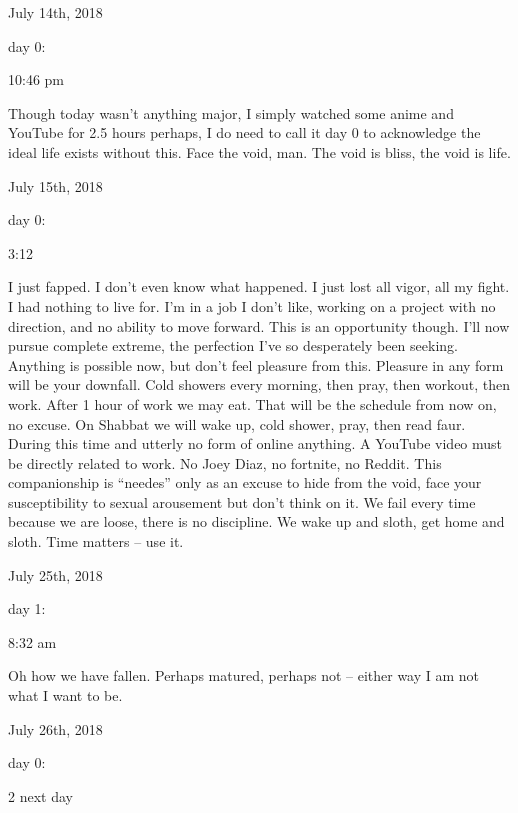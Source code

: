 \bigskip
\bigskip
July 14th, 2018

day 0:

10:46 pm

Though today wasn't anything major, I simply watched some anime and
YouTube for 2.5 hours perhaps, I do need to call it day 0 to acknowledge
the ideal life exists without this. Face the void, man. The void is
bliss, the void is life.

\bigskip
\bigskip
July 15th, 2018

day 0:

3:12

I just fapped. I don't even know what happened. I just lost all vigor,
all my fight. I had nothing to live for. I'm in a job I don't like,
working on a project with no direction, and no ability to move forward.
This is an opportunity though. I'll now pursue complete extreme, the
perfection I've so desperately been seeking. Anything is possible now,
but don't feel pleasure from this. Pleasure in any form will be your
downfall. Cold showers every morning, then pray, then workout, then
work. After 1 hour of work we may eat. That will be the schedule from
now on, no excuse. On Shabbat we will wake up, cold shower, pray, then
read faur. During this time and utterly no form of online anything. A
YouTube video must be directly related to work. No Joey Diaz, no
fortnite, no Reddit. This companionship is ``needes'' only as an excuse
to hide from the void, face your susceptibility to sexual arousement but
don't think on it. We fail every time because we are loose, there is no
discipline. We wake up and sloth, get home and sloth. Time matters --
use it.

\bigskip
\bigskip
July 25th, 2018

day 1:

8:32 am

Oh how we have fallen. Perhaps matured, perhaps not -- either way I am
not what I want to be.

\bigskip
\bigskip
July 26th, 2018

day 0:

2 next day

